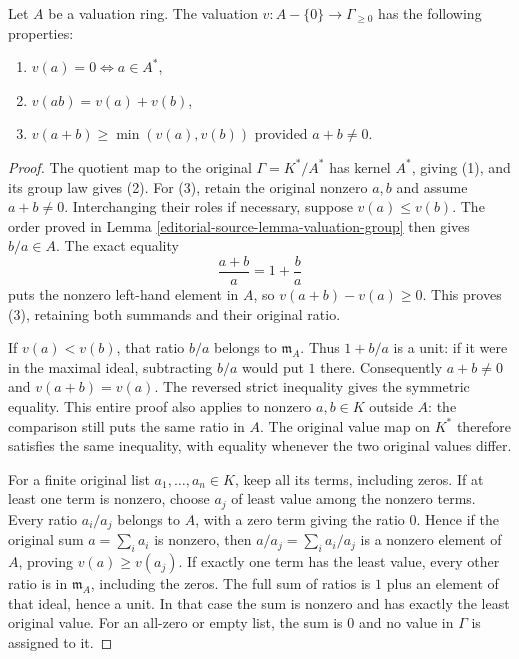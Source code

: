 \begin{lemma}
\label{editorial-source-lemma-properties-valuation}
Let $A$ be a valuation ring. The valuation $v : A -\{0\} \to \Gamma_{\geq 0}$
has the following properties:
\begin{enumerate}
\item $v(a) = 0 \Leftrightarrow a \in A^*$,
\item $v(ab) = v(a) + v(b)$,
\item $v(a + b) \geq \min(v(a), v(b))$ provided $a + b \not = 0$.
\end{enumerate}
\end{lemma}

\begin{proof}
The quotient map to the
original $\Gamma=K^*/A^*$
has kernel $A^*$, giving
(1), and its group law
gives (2). For (3), retain
the original nonzero $a,b$
and assume $a+b\neq0$.
Interchanging their roles
if necessary, suppose
$v(a)\leq v(b)$. The
order proved in Lemma
\ref{editorial-source-lemma-valuation-group}
then gives $b/a\in A$.
The exact equality
$$
\frac{a+b}{a}=1+\frac ba
$$
puts the nonzero left-hand
element in $A$, so
$v(a+b)-v(a)\geq0$.
This proves (3), retaining
both summands and their
original ratio.

If $v(a)<v(b)$, that
ratio $b/a$ belongs to
$\mathfrak m_A$. Thus
$1+b/a$ is a unit:
if it were in the maximal
ideal, subtracting $b/a$
would put $1$ there.
Consequently $a+b\neq0$
and $v(a+b)=v(a)$.
The reversed strict inequality
gives the symmetric equality.
This entire proof also
applies to nonzero $a,b\in K$
outside $A$: the comparison
still puts the same ratio
in $A$. The original value
map on $K^*$ therefore
satisfies the same inequality,
with equality whenever the
two original values differ.

For a finite original list
$a_1,\ldots,a_n\in K$, keep
all its terms, including
zeros. If at least one
term is nonzero, choose
$a_j$ of least value among
the nonzero terms. Every
ratio $a_i/a_j$ belongs
to $A$, with a zero
term giving the ratio $0$.
Hence if the original sum
$a=\sum_i a_i$ is nonzero,
then $a/a_j=\sum_i a_i/a_j$
is a nonzero element of
$A$, proving $v(a)\geq v(a_j)$.
If exactly one term has
the least value, every
other ratio is in
$\mathfrak m_A$, including
the zeros. The full sum
of ratios is $1$ plus
an element of that ideal,
hence a unit. In that
case the sum is nonzero
and has exactly the least
original value. For an
all-zero or empty list,
the sum is $0$ and no
value in $\Gamma$ is
assigned to it.
\end{proof}

